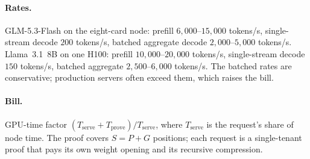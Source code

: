 \documentclass[11pt]{article}
\begin{document}
\paragraph{Rates.}
GLM-5.3-Flash on the eight-card node: prefill \(6{,}000\)--\(15{,}000\) tokens/s, single-stream decode \(200\) tokens/s, batched aggregate decode \(2{,}000\)--\(5{,}000\) tokens/s.
Llama~3.1~8B on one H100: prefill \(10{,}000\)--\(20{,}000\) tokens/s, single-stream decode \(150\) tokens/s, batched aggregate \(2{,}500\)--\(6{,}000\) tokens/s.
The batched rates are conservative; production servers often exceed them, which raises the bill.

\paragraph{Bill.}
GPU-time factor \((T_{\mathrm{serve}} + T_{\mathrm{prove}})/T_{\mathrm{serve}}\), where \(T_{\mathrm{serve}}\) is the request's share of node time.
The proof covers \(S = P + G\) positions; each request is a single-tenant proof that pays its own weight opening and its recursive compression.
\end{document}
